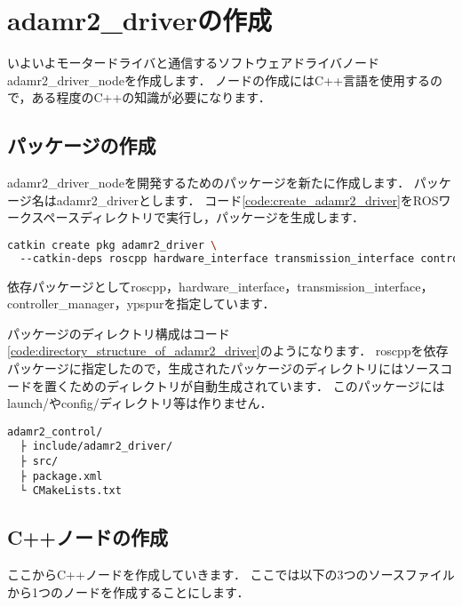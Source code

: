 \documentclass[{../../master}]{subfiles}
\begin{document}
\section{\textsf{adamr2\_driver}の作成}

いよいよモータードライバと通信するソフトウェアドライバノード\textsf{adamr2\_driver\_node}を作成します．
ノードの作成にはC++言語を使用するので，ある程度のC++の知識が必要になります．

\subsection{パッケージの作成}

\textsf{adamr2\_driver\_node}を開発するためのパッケージを新たに作成します．
パッケージ名は\textsf{adamr2\_driver}とします．
コード\ref{code:create_adamr2_driver}をROSワークスペースディレクトリで実行し，パッケージを生成します．

\begin{lstlisting}[language=sh, label=code:create_adamr2_driver, caption= Create \textsf{adamr2\_driver} Package]
catkin create pkg adamr2_driver \ 
  --catkin-deps roscpp hardware_interface transmission_interface controller_manager ypspur
\end{lstlisting}

依存パッケージとして\textsf{roscpp}，\textsf{hardware\_interface}，\textsf{transmission\_interface}，\textsf{controller\_manager}，\textsf{ypspur}を指定しています．

パッケージのディレクトリ構成はコード\ref{code:directory_structure_of_adamr2_driver}のようになります．
\textsf{roscpp}を依存パッケージに指定したので，生成されたパッケージのディレクトリにはソースコードを置くためのディレクトリが自動生成されています．
このパッケージには\textsf{launch/}や\textsf{config/}ディレクトリ等は作りません．

\begin{lstlisting}[label=code:directory_structure_of_adamr2_driver, caption=Directory Structure of \textsf{adamr2\_driver}]
adamr2_control/
  ├ include/adamr2_driver/
  ├ src/
  ├ package.xml
  └ CMakeLists.txt
\end{lstlisting}

\subsection{C++ノードの作成}

ここからC++ノードを作成していきます．
ここでは以下の3つのソースファイルから1つのノードを作成することにします．
\end{document}
